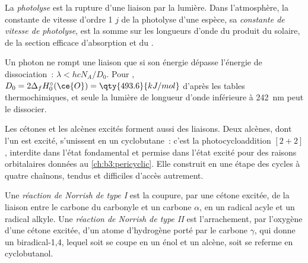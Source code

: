 \begin{definition}[Photolyse]\label{def:b3:photochemistry:photolysis}
La \emph{photolyse} est la rupture d'une liaison par la
lumière. Dans l'atmosphère, la constante de vitesse d'ordre 1 $j$ de la
photolyse d'une espèce, sa \emph{constante de vitesse de
photolyse}, est la somme sur les
longueurs d'onde du produit du  solaire, de la section
efficace d'absorption et du .
\end{definition}

Un photon ne rompt une liaison que si son énergie dépasse l'énergie de
dissociation~:
$\lambda < hcN_A/D_0$. Pour , $D_0 = 2\Delta_fH^\circ_0(\ce{O}) = \qty{493.6}{kJ/mol}$
d'après les tables thermochimiques, et seule la lumière de longueur
d'onde inférieure à \qty{242}{nm} peut le dissocier.

Les cétones et les alcènes excités forment aussi des liaisons. Deux
alcènes, dont l'un est excité, s'unissent en un cyclobutane~: c'est la
photocycloaddition $[2+2]$, interdite dans l'état fondamental et permise
dans l'état excité pour des raisons orbitalaires données au
\cref{ch:b3:pericyclic}. Elle construit en une étape des cycles à quatre
chaînons, tendus et difficiles d'accès autrement.

\begin{definition}\label{def:b3:photochemistry:norrish}
Une \emph{réaction de Norrish de type I} est la coupure,
par une cétone excitée, de la liaison entre le carbone du carbonyle et un
carbone $\alpha$, en un radical acyle et un radical alkyle. Une
\emph{réaction de Norrish de type II}
est l'arrachement, par l'oxygène d'une cétone excitée, d'un atome
d'hydrogène porté par le carbone $\gamma$, qui donne un biradical-1,4,
lequel soit se coupe en un énol et un alcène, soit se referme en
cyclobutanol.
\end{definition}

